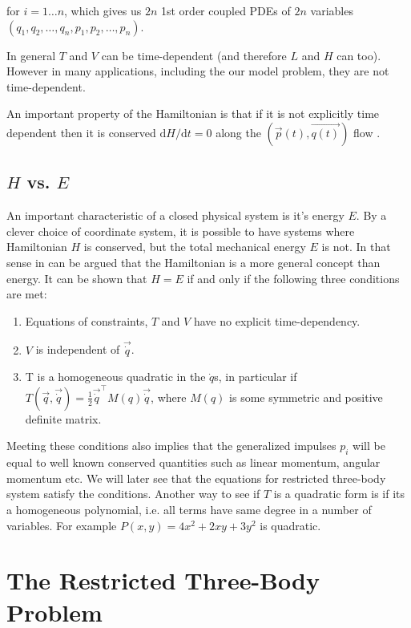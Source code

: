 for $i = 1 \dots n$, which gives us $2n$ 1st order coupled PDEs of $2n$ variables $(q_1,q_2,\dots,q_n,p_1,p_2,\dots,p_n)$.

In general $T$ and $V$ can be time-dependent (and therefore $L$ and $H$ can too). However in many applications, including the our model problem, they are not time-dependent.

An important property of the Hamiltonian is that if it is not explicitly time dependent then it is conserved $\mathrm{d}H/\mathrm{d}t = 0$ along the $(\vec{p}(t),\vec{q(t)})$ flow \cite{Hjorth2015}.


\subsection{$H$ vs. $E$} \label{ch:HvsE}

An important characteristic of a closed physical system is it's energy $E$. By a clever choice of coordinate system, it is possible to have systems where Hamiltonian $H$ is conserved, but the total mechanical energy $E$ is not. In that sense in can be argued that the Hamiltonian is a more general concept than energy. It can be shown that $H = E$ if and only if the following three conditions are met: \cite[p. 60-64]{Goldstein2002} \cite{ucsd-quadratic} \cite{unige-quadradic}

\begin{enumerate}
    \item Equations of constraints, $T$ and $V$ have no explicit time-dependency.
    \item $V$ is independent of $\vec{\dot{q}}$.
    \item T is a homogeneous quadratic in the $\dot{q}$s, in particular if $T(\vec{q},\vec{\dot{q}}) = \frac{1}{2} \vec{\dot{q}}^\top M(q)\vec{\dot{q}}$, where $M(q)$ is some symmetric and positive definite matrix.
\end{enumerate}
Meeting these conditions also implies that the generalized impulses $p_i$ will be equal to well known conserved quantities such as linear momentum, angular momentum etc. We will later see that the equations for restricted three-body system satisfy the conditions. Another way to see if $T$ is a quadratic form is if its a homogeneous polynomial, i.e. all terms have same degree in a number of variables. For example $P(x,y) = 4x^2 + 2 x y + 3y^2$ \cite{wiki-quadratic} is quadratic.


\section{The Restricted Three-Body Problem}
